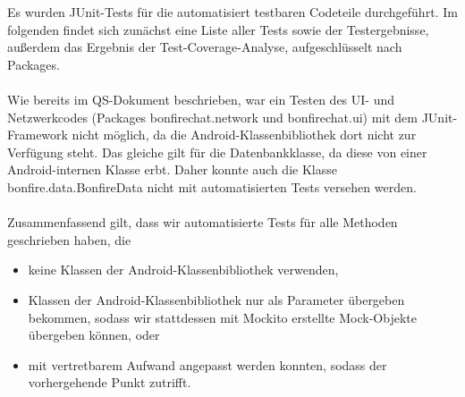 Es wurden JUnit-Tests für die automatisiert testbaren Codeteile durchgeführt.
Im folgenden findet sich zunächst eine Liste aller Tests sowie der Testergebnisse,
außerdem das Ergebnis der Test-Coverage-Analyse, aufgeschlüsselt nach Packages.
\\\\
Wie bereits im QS-Dokument beschrieben, war ein Testen des UI- und Netzwerkcodes
(Packages bonfirechat.network und bonfirechat.ui)
mit dem JUnit-Framework nicht möglich, da die Android-Klassenbibliothek dort nicht
zur Verfügung steht. Das gleiche gilt für die Datenbankklasse, da diese von einer
Android-internen Klasse erbt. Daher konnte auch die Klasse bonfire.data.BonfireData
nicht mit automatisierten Tests versehen werden.
\\\\
Zusammenfassend gilt, dass wir automatisierte Tests für alle Methoden geschrieben haben,
die
\begin{itemize}
\item keine Klassen der Android-Klassenbibliothek verwenden,
\item Klassen der Android-Klassenbibliothek nur als Parameter übergeben bekommen,
sodass wir stattdessen mit Mockito erstellte Mock-Objekte übergeben können, oder
\item mit vertretbarem Aufwand angepasst werden konnten, sodass der vorhergehende Punkt zutrifft.
\end{itemize}










